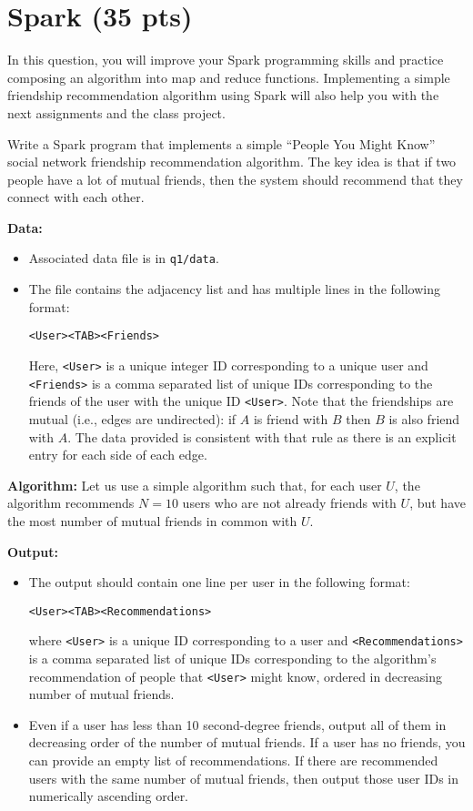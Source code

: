 \section{Spark (35 pts)}

In this question, you will improve your Spark programming skills and practice composing an algorithm into map and reduce functions. Implementing a simple friendship recommendation algorithm using Spark will also help you with the next assignments and the class project. 

Write a Spark program that implements a simple ``People You Might Know'' social network friendship recommendation algorithm. The key idea is that if two people have a lot of mutual friends, then the system should recommend that they connect with each other.


{\bf Data:} 
\begin{itemize}
    \item Associated data file is {\color{blue}{\tt soc-LiveJournal1Adj.txt}} in {\tt q1/data}.
    \item The file contains the adjacency list and has multiple lines in the following format:

{\tt \textless User\textgreater \textless TAB\textgreater \textless Friends\textgreater}

Here, {\tt \textless User\textgreater} is a unique integer ID corresponding to a unique user and {\tt \textless Friends\textgreater} is a comma separated list of unique IDs corresponding to the friends of the user with the unique ID {\tt \textless User\textgreater}. Note that the friendships are mutual (i.e., edges are undirected): if $A$ is friend with $B$ then $B$ is also friend with $A$. The data provided is consistent with that rule as there is an explicit entry for each side of each edge.
\end{itemize}


{\bf Algorithm:} Let us use a simple algorithm such that, for each user $U$, the algorithm recommends $N=10$ users who are not already friends with $U$, but have the most number of mutual friends in common with $U$. 

{\bf Output:} 
\begin{itemize}
    \item The output should contain one line per user in the following format:

{\tt \textless User\textgreater\textless TAB\textgreater\textless Recommendations\textgreater}

where {\tt \textless User\textgreater} is a unique ID corresponding to a user and {\tt \textless Recommendations\textgreater} is a comma separated list of unique IDs corresponding to the algorithm's recommendation of people that {\tt \textless User\textgreater} might know, ordered in decreasing number of mutual friends.
    \item Even if a user has less than 10 second-degree friends, output all of them in decreasing order of the number of mutual friends. If a user has no friends, you can provide an empty list of recommendations. If there are recommended users with the same number of mutual friends, then output those user IDs in numerically ascending order.
\end{itemize} 

